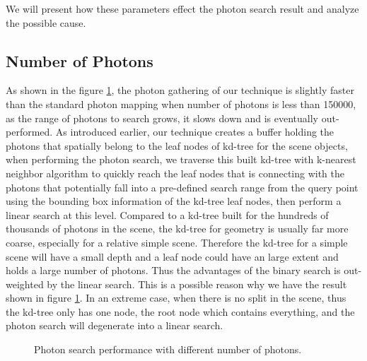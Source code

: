 We will present how these parameters effect the photon search result and analyze the possible cause.

\subsection{Number of Photons}

As shown in the figure \ref{fig:photon_search_1}, the photon gathering of our technique is slightly faster than the standard photon mapping when number of photons is less than 150000, as the range of photons to search grows, it slows down and is eventually out-performed. As introduced earlier, our technique creates a buffer holding the photons that spatially belong to the leaf nodes of kd-tree for the scene objects, when performing the photon search, we traverse this built kd-tree with k-nearest neighbor algorithm to quickly reach the leaf nodes that is connecting with the photons that potentially fall into a pre-defined search range from the query point using the bounding box information of the kd-tree leaf nodes, then perform a linear search at this level. Compared to a kd-tree built for the hundreds of thousands of photons in the scene, the kd-tree for geometry is usually far more coarse, especially for a relative simple scene. Therefore the kd-tree for a simple scene will have a small depth and a leaf node could have an large extent and holds a large number of photons. Thus the advantages of the binary search is out-weighted by the linear search. This is a possible reason why we have the result shown in figure \ref{fig:photon_search_1}. In an extreme case, when there is no split in the scene, thus the kd-tree only has one node, the root node which contains everything, and the photon search will degenerate into a linear search.

\begin{figure}[ftp]
    \centering
    \renewcommand{\thefigure}{\thechapter.\arabic{figure}}
    \caption[Photon search performance with different number of photons]{Photon search performance with different number of photons. }
    \label{fig:photon_search_1}
\end{figure}

